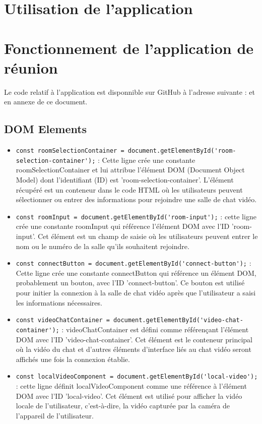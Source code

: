 \documentclass[12pt, a4paper, oneside]{thesis}
\begin{document}
\newpage

\section{Utilisation de l'application}

\newpage

\section{Fonctionnement de l'application de réunion}

Le code relatif à l'application est disponnible sur GitHub à l'adresse suivante : et en annexe de ce document.

\subsection{DOM Elements}

\begin{itemize}
  \item \verb|const roomSelectionContainer = document.getElementById('room-selection-container');| : Cette ligne crée une constante roomSelectionContainer et lui attribue l'élément DOM (Document Object Model) dont l'identifiant (ID) est 'room-selection-container'. L'élément récupéré est un conteneur dans le code HTML où les utilisateurs peuvent sélectionner ou entrer des informations pour rejoindre une salle de chat vidéo.
  \item \verb|const roomInput = document.getElementById('room-input');| : cette ligne crée une constante roomInput qui référence l'élément DOM avec l'ID 'room-input'. Cet élément est un champ de saisie où les utilisateurs peuvent entrer le nom ou le numéro de la salle qu'ils souhaitent rejoindre.
  \item \verb|const connectButton = document.getElementById('connect-button');| :  Cette ligne crée une constante connectButton qui référence un élément DOM, probablement un bouton, avec l'ID 'connect-button'. Ce bouton est utilisé pour initier la connexion à la salle de chat vidéo après que l'utilisateur a saisi les informations nécessaires.
  \item \verb|const videoChatContainer = document.getElementById('video-chat-container');| : videoChatContainer est défini comme référençant l'élément DOM avec l'ID 'video-chat-container'. Cet élément est le conteneur principal où la vidéo du chat et d'autres éléments d'interface liés au chat vidéo seront affichés une fois la connexion établie.
  \item \verb|const localVideoComponent = document.getElementById('local-video');| :  cette ligne définit localVideoComponent comme une référence à l'élément DOM avec l'ID 'local-video'. Cet élément est utilisé pour afficher la vidéo locale de l'utilisateur, c'est-à-dire, la vidéo capturée par la caméra de l'appareil de l'utilisateur.
\end{itemize}
\end{document}

